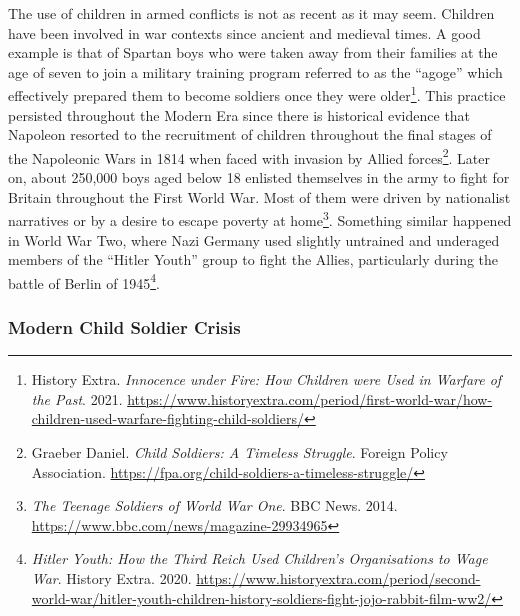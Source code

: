 The use of children in armed conflicts is not as recent as it may seem. Children have been involved in war contexts since ancient and medieval times. A good example is that of Spartan boys who were taken away from their families at the age of seven to join a military training program referred to as the “agoge” which effectively prepared them to become soldiers once they were older\footnote{History Extra. \emph{Innocence under Fire: How Children were Used in Warfare of the Past}. 2021. \url{https://www.historyextra.com/period/first-world-war/how-children-used-warfare-fighting-child-soldiers/}}. This practice persisted throughout the Modern Era since there is historical evidence that Napoleon resorted to the recruitment of children throughout the final stages of the Napoleonic Wars in 1814 when faced with invasion by Allied forces\footnote{Graeber Daniel. \emph{Child Soldiers: A Timeless Struggle}. Foreign Policy Association. \url{https://fpa.org/child-soldiers-a-timeless-struggle/}}. Later on, about 250,000 boys aged below 18 enlisted themselves in the army to fight for Britain throughout the First World War. Most of them were driven by nationalist narratives or by a desire to escape poverty at home\footnote{\emph{The Teenage Soldiers of World War One}. BBC News.  2014. \url{https://www.bbc.com/news/magazine-29934965}}. Something similar happened in World War Two, where Nazi Germany used slightly untrained and underaged members of the “Hitler Youth” group to fight the Allies, particularly during the battle of Berlin of 1945\footnote{\emph{Hitler Youth: How the Third Reich Used Children’s Organisations to Wage War}. History Extra. 2020. \url{https://www.historyextra.com/period/second-world-war/hitler-youth-children-history-soldiers-fight-jojo-rabbit-film-ww2/}}.

\subsubsection{Modern Child Soldier Crisis}

